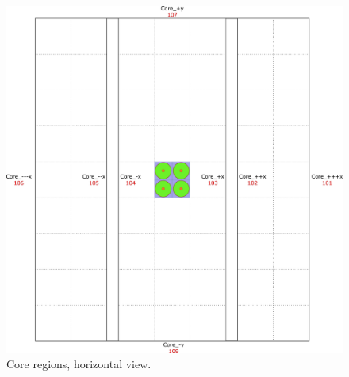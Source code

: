 \documentclass{UWNR_modeling}
\begin{document}
\begin{figure}[H]
  \centering
  \includegraphics[width=7in]{core_xy.pdf}
  \caption{Core regions, horizontal view.}
  \label{fig:core_xy}
\end{figure}
\end{document}
